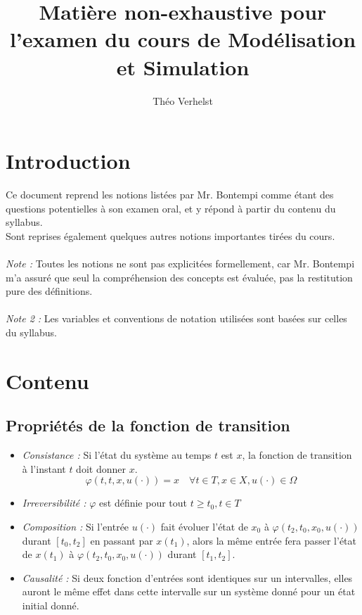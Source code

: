 \documentclass[a4paper]{article}
\author{Théo Verhelst}
\title{Matière non-exhaustive pour l'examen du cours de Modélisation et
Simulation}
\begin{document}
\maketitle
\tableofcontents
\section{Introduction}
Ce document reprend les notions listées par Mr. Bontempi comme étant des
questions potentielles à son examen oral, et y répond à partir du contenu du
syllabus.\\
Sont reprises également quelques autres notions importantes tirées du cours.
\paragraph{}
\emph{Note :} Toutes les notions ne sont pas explicitées formellement, car
Mr. Bontempi m'a assuré que seul la compréhension des concepts est évaluée, pas
la restitution pure des définitions.
\paragraph{}
\emph{Note 2 :} Les variables et conventions de notation utilisées sont basées
sur celles du syllabus.
\section{Contenu}

\subsection{Propriétés de la fonction de transition}
\begin{itemize}
	\item \emph{Consistance :} Si l'état du système au temps $t$ est $x$,
		la fonction de transition à l'instant $t$ doit donner $x$.
		\[\varphi(t,t,x,u(\cdot))=x\quad\forall t\in T, x\in X,
		u(\cdot)\in\Omega\]
	\item \emph{Irreversibilité :} $\varphi$ est définie pour tout
		\(t \ge t_0, t\in T\)
	\item \emph{Composition :} Si l'entrée $u(\cdot)$ fait évoluer l'état de
		$x_0$ à $\varphi(t_2,t_0,x_0,u(\cdot))$ durant $[t_0,t_2]$ en passant
		par $x(t_1)$, alors la même entrée fera passer l'état de $x(t_1)$ à
		$\varphi(t_2,t_0,x_0,u(\cdot))$ durant $[t_1,t_2]$.
	\item \emph{Causalité :} Si deux fonction d'entrées sont identiques sur un
		intervalles, elles auront le même effet dans cette intervalle sur un
		système donné pour un état initial donné.
\end{itemize}
\end{document}
